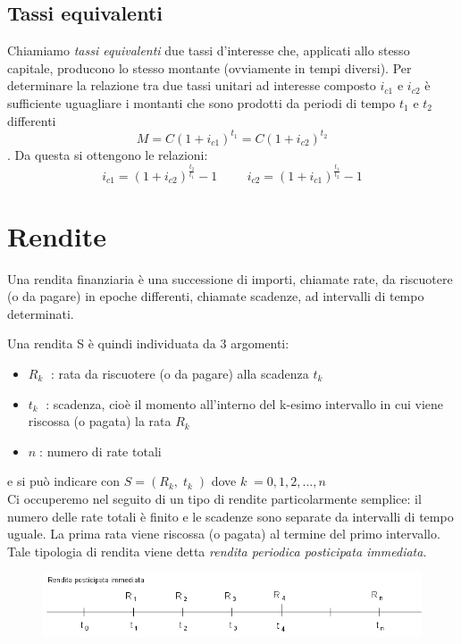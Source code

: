 \subsection{Tassi equivalenti}

Chiamiamo \emph{tassi equivalenti} due tassi d'interesse che, applicati allo stesso capitale,
producono lo stesso montante (ovviamente in tempi diversi).
Per determinare la relazione tra due tassi unitari ad interesse composto 
\(i_{c1}\) e \(i_{c2}\) è sufficiente uguagliare i montanti che sono prodotti da 
periodi di tempo \(t_1\) e \(t_2\) differenti
\[M = C(1+i_{c1})^{t_1} = C(1+i_{c2})^{t_2}\].
Da questa si ottengono le relazioni:
\[i_{c1} = (1+i_{c2})^\frac{t_2}{t_1}-1 \hspace{1cm} i_{c2} = (1+i_{c1})^\frac{t_1}{t_2}-1\]



\section{Rendite}
Una rendita finanziaria è una successione di importi, chiamate rate, da 
riscuotere (o da pagare) in epoche differenti, chiamate scadenze, ad intervalli 
di tempo determinati. 

Una rendita S è quindi individuata da 3 argomenti:

\begin {itemize}[noitemsep]
\item \(R_k\;\) : rata da riscuotere (o da pagare) alla scadenza \(t_k\;\)
\item \(t_k\;\) : scadenza, cioè il momento all'interno del k-esimo intervallo in 
cui viene riscossa (o pagata) la rata \(R_k\;\)
\item \(n\;\): numero di rate totali
\end{itemize}

e si può indicare con \( S= ( R_k , \; t_k\;)\)  dove \( k \;=0,1,2,...,n\)
\\[4pt]
Ci occuperemo nel seguito di un tipo di rendite particolarmente semplice:
il numero delle rate totali è finito e le scadenze sono separate da intervalli 
di tempo uguale. La prima rata viene riscossa (o pagata) 
al termine del primo intervallo. Tale tipologia di rendita viene detta \emph{rendita 
periodica posticipata immediata}.

\begin{figure}[htp]
\centering
\includegraphics[scale=.60]{img/rendite.png}
\caption{}
\label{}
\end{figure}

